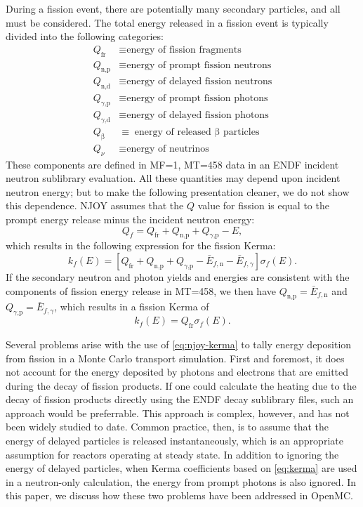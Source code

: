 \documentclass{anstrans}
\newcommand{\efr}{Q_\text{fr}}
\newcommand{\enp}{Q_\text{n,p}}
\newcommand{\ened}{Q_\text{n,d}}
\newcommand{\egp}{Q_\text{$\gamma$,p}}
\newcommand{\egd}{Q_\text{$\gamma$,d}}
\newcommand{\eb}{Q_\upbeta}
\newcommand{\enu}{Q_\nu}
\begin{document}
During a fission event, there are potentially many secondary particles, and all
must be considered. The total energy released in a fission event is typically
divided into the following categories:
\begin{equation*}
\begin{split}
  \efr  &\equiv \text{energy of fission fragments} \\
  \enp  &\equiv \text{energy of prompt fission neutrons} \\
  \ened &\equiv \text{energy of delayed fission neutrons} \\
  \egp  &\equiv \text{energy of prompt fission photons} \\
  \egd  &\equiv \text{energy of delayed fission photons} \\
  \eb   &\equiv \text{energy of released $\upbeta$ particles} \\
  \enu  &\equiv \text{energy of neutrinos}
\end{split}
\end{equation*}
These components are defined in MF=1, MT=458 data in an ENDF incident neutron
sublibrary evaluation. All these quantities may depend upon incident neutron
energy; but to make the following presentation cleaner, we do not show this dependence.
NJOY assumes that the $Q$ value for fission is equal to the prompt
energy release minus the incident neutron energy:
\begin{equation}
    \label{eq:njoy-fissq}
    Q_f = \efr + \enp + \egp - E,
\end{equation}
which results in the following expression for the fission Kerma:
\begin{equation}
    k_f(E) = \left[\efr + \enp + \egp - \bar{E}_{f,\text{n}} - \bar{E}_{f,\gamma}\right]\sigma_f(E).
\end{equation}
If the secondary neutron and photon yields and energies are consistent with the
components of fission energy release in MT=458, we then have $\enp =
\bar{E}_{f,\text{n}}$ and $\egp = \bar{E}_{f,\gamma}$, which results in a
fission Kerma of
\begin{equation}
    \label{eq:njoy-kerma}
    k_f(E) = \efr \sigma_f(E).
\end{equation}

Several problems arise with the use of \cref{eq:njoy-kerma} to tally energy
deposition from fission in a Monte Carlo transport simulation. First and
foremost, it does not account for the energy deposited by photons and electrons
that are emitted during the decay of fission products. If one could 
calculate the heating due to the decay of fission products directly using the
ENDF decay sublibrary files, such an approach would be preferrable. 
This approach is complex, however, and has not been widely studied to date.
Common
practice, then, is to assume that the energy of delayed particles is released
instantaneously, which is an appropriate assumption for reactors operating at
steady state. In addition to ignoring the energy of delayed particles, when
Kerma coefficients based on \cref{eq:kerma} are used in a neutron-only
calculation, the energy from prompt photons is also ignored. In this paper, we
discuss how these two problems have been addressed in OpenMC.
\end{document}
